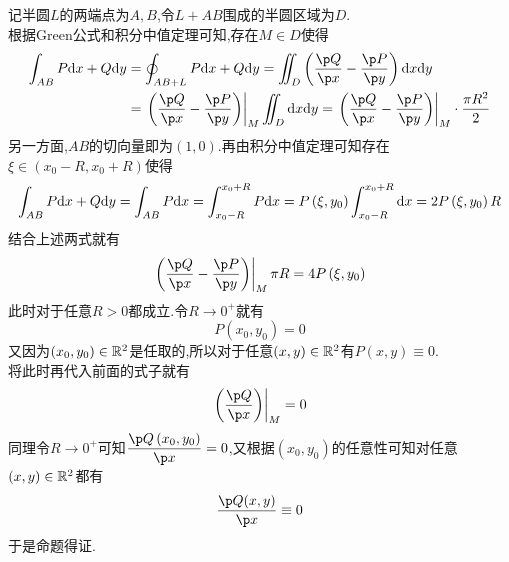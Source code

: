 \documentclass{ctexart}
\begin{document}
\begin{solution}
    记半圆$L$的两端点为$A,B$,令$L+AB$围成的半圆区域为$D$.\\
    根据Green公式和积分中值定理可知,存在$M\in D$使得
    \[\begin{aligned}
        \int_{AB}P\dx+Q\di y
        &= \oint_{AB+L}P\dx+Q\di y = \iint_{D}\left(\dfrac{\p Q}{\p x}-\dfrac{\p P}{\p y}\right)\di x\di y \\
        &= \left.\left(\dfrac{\p Q}{\p x}-\dfrac{\p P}{\p y}\right)\right|_{M}\iint_{D}\di x\di y=\left.\left(\dfrac{\p Q}{\p x}-\dfrac{\p P}{\p y}\right)\right|_{M}\cdot\dfrac{\pi R^2}{2}
    \end{aligned}\]
    另一方面,$AB$的切向量即为$(1,0)$.再由积分中值定理可知存在$\xi\in\left(x_0-R,x_0+R\right)$使得
    \[\int_{AB}P\mathrm{d} x+Q\mathrm{d} y
    = \int_{AB}P\mathrm{d} x
    = \int_{x_0-R}^{x_0+R}P\mathrm{d} x
    = P\left(\xi,y_0\right)\int_{x_0-R}^{x_0+R}\mathrm{d} x
    = 2P\left(\xi,y_0\right)R\]
    结合上述两式就有
    \[\left.\left(\dfrac{\p Q}{\p x}-\dfrac{\p P}{\p y}\right)\right|_{M}\pi R=4P\left(\xi,y_0\right)\]
    此时对于任意$R>0$都成立.令$R\to0^+$就有
    \[P\left(x_0,y_0\right)=0\]
    又因为$\left(x_0,y_0\right)\in\mathbb{R}^2$是任取的,所以对于任意$(x,y)\in\mathbb{R}^2$有$P(x,y)\equiv0$.\\
    将此时再代入前面的式子就有
    \[\left.\left(\dfrac{\p Q}{\p x}\right)\right|_{M}=0\]
    同理令$R\to0^+$可知$\dfrac{\p Q\left(x_0,y_0\right)}{\p x}=0$,又根据$\left(x_0,y_0\right)$的任意性可知对任意$(x,y)\in\mathbb{R}^2$都有
    \[\dfrac{\p Q(x,y)}{\p x}\equiv0\]
    于是命题得证.

\end{solution}
\end{document}

